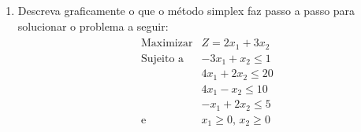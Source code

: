 \documentclass[a4paper,11pt]{article}
\begin{document}
\begin{enumerate}
    \item Descreva graficamente o que o método simplex faz passo a passo para solucionar o problema a seguir:
    \begin{align*}
        \begin{matrix}
            \text{Maximizar} & Z = 2x_1 + 3x_2 \\
            \text{Sujeito a} & -3x_1 + x_2 \leq 1 \\
                             & 4x_1 + 2x_2 \leq 20 \\
                             & 4x_1 - x_2 \leq 10 \\
                             & -x_1 + 2x_2 \leq 5 \\
            \text{e}         & x_1 \geq 0 \text{, } x_2 \geq 0
        \end{matrix}
    \end{align*}
\end{enumerate}
\end{document}
